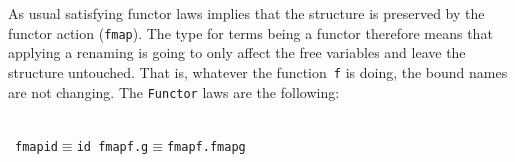 \documentclass[9pt,preprint,authoryear]{sigplanconf}
\begin{document}
%
As usual satisfying functor laws implies that the structure is
    preserved by the functor action (\textcolor[rgb]{0,0,0.80}{\texttt{fmap}}). The type for terms being
    a functor therefore means that applying a renaming is going to only
    affect the free variables and leave the structure untouched. That is,
    whatever the function{~}\textcolor[rgb]{0,0,0.80}{\texttt{f}} is doing, the bound names are not
    changing. The \textcolor[rgb]{0,0,0.80}{\texttt{Functor}} laws are the following{:}%


%
%


{\nopagebreak }

%
%
%
~\\~\vphantom{$\{$}\textcolor[rgb]{0,0,0.80}{\texttt{fmap}}\textcolor[rgb]{0,0,0.80}{\texttt{\mbox{\hspace{0.50em}}}}\textcolor[rgb]{0,0,0.80}{\texttt{id}}\textcolor[rgb]{0,0,0.80}{\texttt{\mbox{\hspace{0.50em}}}}\textcolor[cmyk]{0,0.65,0.99,0}{\texttt{$ \equiv $}}\textcolor[rgb]{0,0,0.80}{\texttt{\mbox{\hspace{0.50em}}}}\textcolor[rgb]{0,0,0.80}{\texttt{id}}\textcolor[rgb]{0,0,0.80}{\texttt{{\nopagebreak \newline%
}\vphantom{$\{$}}}\textcolor[rgb]{0,0,0.80}{\texttt{fmap}}\textcolor[rgb]{0,0,0.80}{\texttt{\mbox{\hspace{0.50em}}}}\textcolor[cmyk]{0,0.65,0.99,0}{\texttt{\makebox[1.22ex][l]{$ {(} $}}}\textcolor[rgb]{0,0,0.80}{\texttt{f}}\textcolor[rgb]{0,0,0.80}{\texttt{\mbox{\hspace{0.50em}}}}\textcolor[cmyk]{0,0.65,0.99,0}{\texttt{.}}\textcolor[rgb]{0,0,0.80}{\texttt{\mbox{\hspace{0.50em}}}}\textcolor[rgb]{0,0,0.80}{\texttt{g}}\textcolor[cmyk]{0,0.65,0.99,0}{\texttt{\makebox[1.22ex][r]{$ {)} $}}}\textcolor[rgb]{0,0,0.80}{\texttt{\mbox{\hspace{0.50em}}}}\textcolor[cmyk]{0,0.65,0.99,0}{\texttt{$ \equiv $}}\textcolor[rgb]{0,0,0.80}{\texttt{\mbox{\hspace{0.50em}}}}\textcolor[rgb]{0,0,0.80}{\texttt{fmap}}\textcolor[rgb]{0,0,0.80}{\texttt{\mbox{\hspace{0.50em}}}}\textcolor[rgb]{0,0,0.80}{\texttt{f}}\textcolor[rgb]{0,0,0.80}{\texttt{\mbox{\hspace{0.50em}}}}\textcolor[cmyk]{0,0.65,0.99,0}{\texttt{.}}\textcolor[rgb]{0,0,0.80}{\texttt{\mbox{\hspace{0.50em}}}}\textcolor[rgb]{0,0,0.80}{\texttt{fmap}}\textcolor[rgb]{0,0,0.80}{\texttt{\mbox{\hspace{0.50em}}}}\textcolor[rgb]{0,0,0.80}{\texttt{g}}\textcolor[rgb]{0,0,0.80}{\texttt{{\nopagebreak \newline%
}\vphantom{$\{$}}}%
\end{document}
